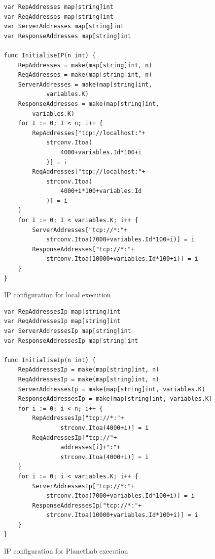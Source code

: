 \documentclass[12pt,a4paper]{report}
\begin{document}
                \begin{figure}
                \centering
                \begin{lstlisting}
var RepAddresses map[string]int
var ReqAddresses map[string]int
var ServerAddresses map[string]int
var ResponseAddresses map[string]int

func InitialiseIP(n int) {
	RepAddresses = make(map[string]int, n)
	ReqAddresses = make(map[string]int, n)
	ServerAddresses = make(map[string]int,
	        variables.K)
	ResponseAddresses = make(map[string]int,
	    variables.K)
	for I := 0; I < n; i++ {
		RepAddresses["tcp://localhost:"+
		    strconv.Itoa(
		        4000+variables.Id*100+i
		    )] = i
		ReqAddresses["tcp://localhost:"+
		    strconv.Itoa(
		        4000+i*100+variables.Id
		    )] = i
	}
	for I := 0; I < variables.K; i++ {
		ServerAddresses["tcp://*:"+
		    strconv.Itoa(7000+variables.Id*100+i)] = i
		ResponseAddresses["tcp://*:"+
		    strconv.Itoa(10000+variables.Id*100+i)] = i
	}
}
                \end{lstlisting}
                \caption{IP configuration for local execution}
                \label{fig:ipconfiguration}
                \end{figure}
                
                \begin{figure}
                    \centering
                        \begin{lstlisting}
var RepAddressesIp map[string]int
var ReqAddressesIp map[string]int
var ServerAddressesIp map[string]int
var ResponseAddressesIp map[string]int

func InitialiseIp(n int) {
	RepAddressesIp = make(map[string]int, n)
	ReqAddressesIp = make(map[string]int, n)
	ServerAddressesIp = make(map[string]int, variables.K)
	ResponseAddressesIp = make(map[string]int, variables.K)
	for i := 0; i < n; i++ {
		RepAddressesIp["tcp://*:"+
		        strconv.Itoa(4000+i)] = i
		ReqAddressesIp["tcp://"+
		        addresses[i]+":"+
		        strconv.Itoa(4000+i)] = i
	}
	for i := 0; i < variables.K; i++ {
		ServerAddressesIp["tcp://*:"+
		    strconv.Itoa(7000+variables.Id*100+i)] = i
		ResponseAddressesIp["tcp://*:"+
		    strconv.Itoa(10000+variables.Id*100+i)] = i
	}
}
                        \end{lstlisting}
                    \caption{IP configuration for PlanetLab execution}
                    \label{fig:ipconfigglobal}
                \end{figure}
	            
\end{document}
